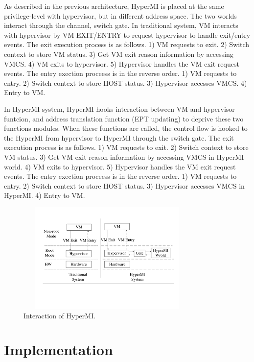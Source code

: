 \documentclass[conference]{IEEEtran}
\begin{document}
\fi
\iffalse
As described in the previous architecture, HyperMI is placed at the same privilege-level with hypervisor, but in different address space. The two worlds interact through the channel, switch gate.
In traditional system, VM interacts with hypervisor  by VM EXIT/ENTRY to request hypervisor to handle exit/entry events. The exit execution process is as follows. 1) VM requests to exit. 2) Switch context to store VM status. 3) Get VM exit reason information by accessing VMCS. 4) VM exits to hypervisor. 5) Hypervisor handles the VM exit request events. 
The entry exection proceess is in the reverse order. 1) VM requests to entry. 2) Switch context to store HOST status. 3) Hypervisor accesses VMCS. 4) Entry to VM.

In HyperMI system, HyperMI hooks interaction between VM and hypervisor funtcion, and address translation function (EPT updating) to deprive these two functions modules.
When these functions are called, the control flow is hooked to the HyperMI from hypervisor to HyperMI through the switch gate.
The exit execution process is as follows. 1) VM requests to exit. 2) Switch context to store VM status. 3) Get VM exit reason information by accessing VMCS in HyperMI world. 4) VM exits to hypervisor. 5) Hypervisor handles the VM exit request events. 
The entry exection proceess is in the reverse order. 1) VM requests to entry. 2) Switch context to store HOST status. 3) Hypervisor accesses VMCS in HyperMI. 4) Entry to VM.



\begin{figure}
\centerline{\includegraphics[width=9cm, height=5.5cm]{pdfvmcsProcess.pdf}}
\caption{Interaction of HyperMI. } \label{fig+1}
\end{figure}


\section{Implementation}
\end{document}
